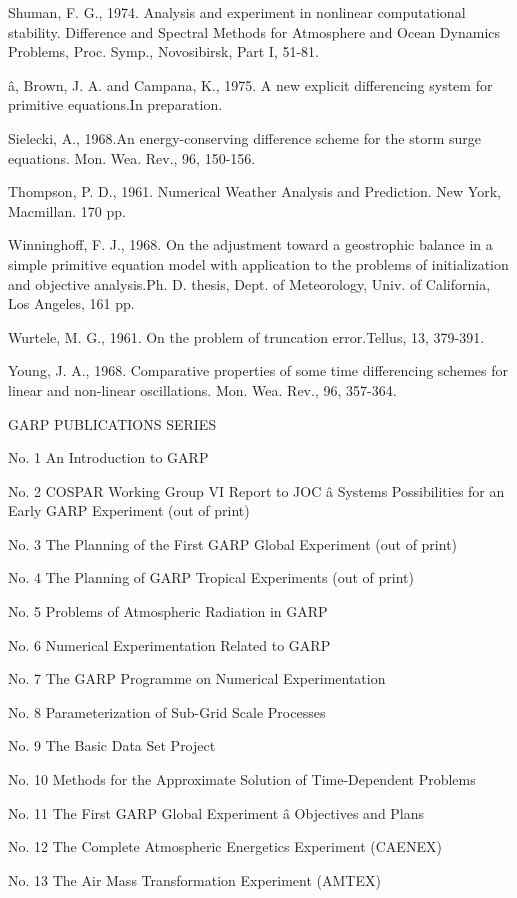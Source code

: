 Shuman, F. G., 1974. Analysis and experiment in nonlinear computational
stability. Difference and Spectral Methods for Atmosphere and Ocean
Dynamics Problems, Proc. Symp., Novosibirsk, Part I, 51-81.

â, Brown, J. A. and Campana, K., 1975. A new explicit differencing
system for primitive equations.In preparation.

Sielecki, A., 1968.An energy-conserving difference scheme for the storm
surge equations. Mon. Wea. Rev., 96, 150-156.

Thompson, P. D., 1961. Numerical Weather Analysis and Prediction. New
York, Macmillan. 170 pp.

Winninghoff, F. J., 1968. On the adjustment toward a geostrophic balance
in a simple primitive equation model with application to the problems of
initialization and objective analysis.Ph. D. thesis, Dept. of
Meteorology, Univ. of California, Los Angeles, 161 pp.

Wurtele, M. G., 1961. On the problem of truncation error.Tellus, 13,
379-391.

Young, J. A., 1968. Comparative properties of some time differencing
schemes for linear and non-linear oscillations. Mon. Wea. Rev., 96,
357-364.

GARP PUBLICATIONS SERIES

No. 1 An Introduction to GARP

No. 2 COSPAR Working Group VI Report to JOC â Systems Possibilities for
an Early GARP Experiment (out of print)

No. 3 The Planning of the First GARP Global Experiment (out of print)

No. 4 The Planning of GARP Tropical Experiments (out of print)

No. 5 Problems of Atmospheric Radiation in GARP

No. 6 Numerical Experimentation Related to GARP

No. 7 The GARP Programme on Numerical Experimentation

No. 8 Parameterization of Sub-Grid Scale Processes

No. 9 The Basic Data Set Project

No. 10 Methods for the Approximate Solution of Time-Dependent Problems

No. 11 The First GARP Global Experiment â Objectives and Plans

No. 12 The Complete Atmospheric Energetics Experiment (CAENEX)

No. 13 The Air Mass Transformation Experiment (AMTEX)

